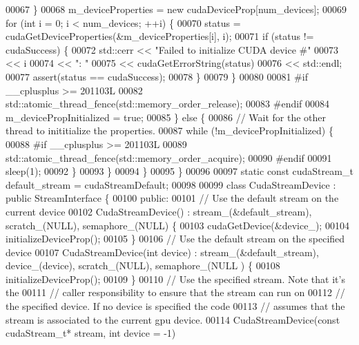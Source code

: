 \begin{DoxyCode}
00067       \}
00068       m\_deviceProperties = \textcolor{keyword}{new} cudaDeviceProp[num\_devices];
00069       \textcolor{keywordflow}{for} (\textcolor{keywordtype}{int} i = 0; i < num\_devices; ++i) \{
00070         status = cudaGetDeviceProperties(&m\_deviceProperties[i], i);
00071         \textcolor{keywordflow}{if} (status != cudaSuccess) \{
00072           std::cerr << \textcolor{stringliteral}{"Failed to initialize CUDA device #"}
00073                     << i
00074                     << \textcolor{stringliteral}{": "}
00075                     << cudaGetErrorString(status)
00076                     << std::endl;
00077           assert(status == cudaSuccess);
00078         \}
00079       \}
00080 
00081 \textcolor{preprocessor}{#if \_\_cplusplus >= 201103L}
00082       std::atomic\_thread\_fence(std::memory\_order\_release);
00083 \textcolor{preprocessor}{#endif}
00084       m\_devicePropInitialized = \textcolor{keyword}{true};
00085     \} \textcolor{keywordflow}{else} \{
00086       \textcolor{comment}{// Wait for the other thread to inititialize the properties.}
00087       \textcolor{keywordflow}{while} (!m\_devicePropInitialized) \{
00088 \textcolor{preprocessor}{#if \_\_cplusplus >= 201103L}
00089         std::atomic\_thread\_fence(std::memory\_order\_acquire);
00090 \textcolor{preprocessor}{#endif}
00091         sleep(1);
00092       \}
00093     \}
00094   \}
00095 \}
00096 
00097 \textcolor{keyword}{static} \textcolor{keyword}{const} cudaStream\_t default\_stream = cudaStreamDefault;
00098 
00099 \textcolor{keyword}{class }CudaStreamDevice : \textcolor{keyword}{public} StreamInterface \{
00100  \textcolor{keyword}{public}:
00101   \textcolor{comment}{// Use the default stream on the current device}
00102   CudaStreamDevice() : stream\_(&default\_stream), scratch\_(NULL), semaphore\_(NULL) \{
00103     cudaGetDevice(&device\_);
00104     initializeDeviceProp();
00105   \}
00106   \textcolor{comment}{// Use the default stream on the specified device}
00107   CudaStreamDevice(\textcolor{keywordtype}{int} device) : stream\_(&default\_stream), device\_(device), scratch\_(NULL), semaphore\_(NULL
      ) \{
00108     initializeDeviceProp();
00109   \}
00110   \textcolor{comment}{// Use the specified stream. Note that it's the}
00111   \textcolor{comment}{// caller responsibility to ensure that the stream can run on}
00112   \textcolor{comment}{// the specified device. If no device is specified the code}
00113   \textcolor{comment}{// assumes that the stream is associated to the current gpu device.}
00114   CudaStreamDevice(\textcolor{keyword}{const} cudaStream\_t* stream, \textcolor{keywordtype}{int} device = -1)

\end{DoxyCode}
